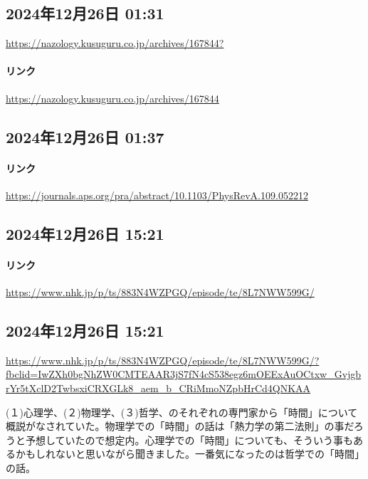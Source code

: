 \subsection*{2024年12月26日 01:31}

\url{https://nazology.kusuguru.co.jp/archives/167844?}

\paragraph{リンク}
\url{https://nazology.kusuguru.co.jp/archives/167844}

\subsection*{2024年12月26日 01:37}

\paragraph{リンク}
\url{https://journals.aps.org/pra/abstract/10.1103/PhysRevA.109.052212}

\subsection*{2024年12月26日 15:21}

\paragraph{リンク}
\url{https://www.nhk.jp/p/ts/883N4WZPGQ/episode/te/8L7NWW599G/}

\subsection*{2024年12月26日 15:21}

\url{https://www.nhk.jp/p/ts/883N4WZPGQ/episode/te/8L7NWW599G/?fbclid=IwZXh0bgNhZW0CMTEAAR3jS7fN4cS538egz6mOEExAuOCtxw_GvjgbrYr5tXclD2TwbsxiCRXGLk8_aem_b_CRiMmoNZpbHrCd4QNKAA}

(１)心理学、(２)物理学、(３)哲学、のそれぞれの専門家から「時間」について概説がなされていた。物理学での「時間」の話は「熱力学の第二法則」の事だろうと予想していたので想定内。心理学での「時間」についても、そういう事もあるかもしれないと思いながら聞きました。一番気になったのは哲学での「時間」の話。

